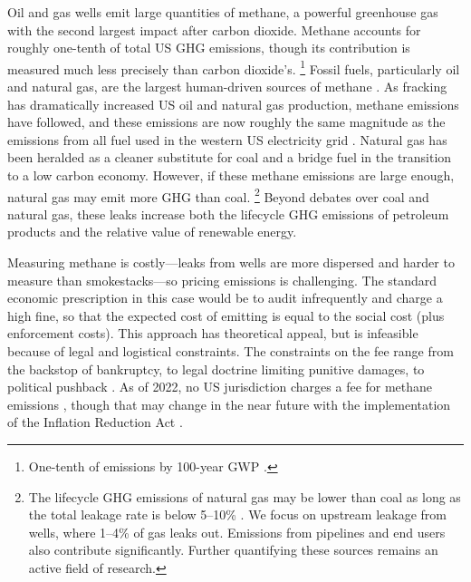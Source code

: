 Oil and gas wells emit large quantities of methane, a powerful greenhouse gas with the second largest impact after carbon dioxide.
Methane accounts for roughly one-tenth of total US \gls{GHG} emissions, though its contribution is measured much less precisely than carbon dioxide's.%
\footnote{One-tenth of emissions by 100-year \gls{GWP}
\parencite{epa-ghgi:2023}.
}
Fossil fuels, particularly oil and natural gas, are the largest human-driven sources of methane \parencite{epa-ghgi:2023, Alvarez/etal:2018}.
As fracking has dramatically increased US oil and natural gas production, methane emissions have followed, and these emissions are now roughly the same magnitude as the emissions from all fuel used in the western US electricity grid \parencite{epa-egrid-2018}.
Natural gas has been heralded as a cleaner substitute for coal and a bridge fuel in the transition to a low carbon economy.
However, if these methane emissions are large enough, natural gas may emit more \gls{GHG} than coal.%
\footnote{%
The lifecycle \gls{GHG} emissions of natural gas may be lower than coal as long as the total leakage rate is below 5--10\% \parencite{Hausfather:2015}.
We focus on upstream leakage from wells, where 1--4\% of gas leaks out.
Emissions from pipelines and end users also contribute significantly.
Further quantifying these sources remains an active field of research.
}
Beyond debates over coal and natural gas, these leaks increase both the lifecycle \gls{GHG} emissions of petroleum products and the relative value of renewable energy.


Measuring methane is costly---leaks from wells are more dispersed and harder to measure than smokestacks---so pricing emissions is challenging.
The standard economic prescription in this case would be to audit infrequently and charge a high fine, so that the expected cost of emitting is equal to the social cost (plus enforcement costs).
This approach has theoretical appeal, but is infeasible because of legal and logistical constraints.
The constraints on the fee range from the backstop of bankruptcy, to legal doctrine limiting punitive damages, to political pushback \parencite{Boomhower:2019, exxon_v_baker:2008}.
As of 2022, no US jurisdiction charges a fee for methane emissions
\parencite{Rabe/Kaliban/Englehart:2020}, though that may change in the near future with the implementation of the Inflation Reduction Act \parencite{InflationReductionActMethaneFee}.


